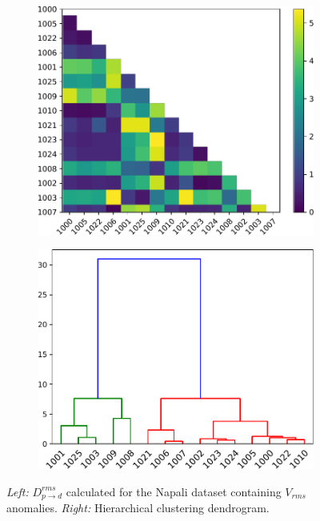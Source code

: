 \begin{figure}[ht!]
    \centering
    \begin{subfigure}{0.45\textwidth}
        \centering
        \includegraphics[width=1\linewidth]{img/napali_eval/subthreshold/clustering/distance_rms.pdf}
        \caption{}
        \label{fig:expdes:sub:cluster_rms:di}
    \end{subfigure} \hspace{5mm}
    \begin{subfigure}{0.45\textwidth}
        \centering
        \includegraphics[width=1\linewidth]{img/napali_eval/subthreshold/clustering/dendrogram_rms.pdf}
        \caption{}
        \label{fig:expdes:sub:cluster_rms:de}
    \end{subfigure}
    \caption{
    \textit{Left:} $D_{p \rightarrow d}^{rms}$ calculated for the Napali dataset containing $V_{rms}$ anomalies.
    \textit{Right:} Hierarchical clustering dendrogram.
    }
    \label{fig:expdes:sub:cluster_rms}
\end{figure}

